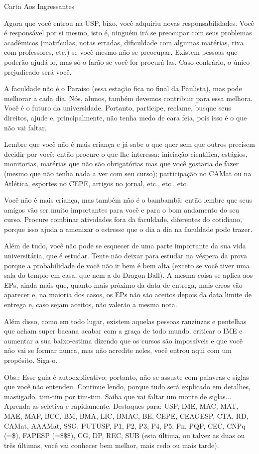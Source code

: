 \begin{secao}{Carta Aos Ingressantes}

Agora que você entrou na USP, bixo, você adquiriu novas responsabilidades.
Você é responsável por si mesmo, isto é, ninguém irá se preocupar com seus
problemas acadêmicos (matrículas, notas erradas, dificuldade com algumas
matérias, rixa com professores, etc.) se você mesmo não se preocupar. Existem
pessoas que poderão ajudá-lo, mas só o farão se você for procurá-las. Caso
contrário, o único prejudicado será você.

A faculdade não é o Paraíso (essa estação fica no final da Paulista), mas pode
melhorar a cada dia. Nós, alunos, também devemos contribuir para essa melhora.
Você é o futuro da universidade. Portanto, participe, reclame, busque seus
direitos, ajude e, principalmente, não tenha medo de cara feia, pois isso é o
que não vai faltar. 

Lembre que você não é mais criança e já sabe o que quer sem que outros precisem decidir por você; então procure o que lhe interessa: iniciação científica,
estágios, monitorias, matérias que não são obrigatórias mas que você gostaria
de fazer (mesmo que não tenha nada a ver com seu curso); participação no
CAMat ou na Atlética, esportes no CEPE, artigos no jornal, etc., etc., etc.

Você não é mais criança, mas também não é o bambambã; então lembre que
seus amigos vão ser muito importantes para você e para o bom andamento do seu
curso. Procure combinar atividades fora da faculdade, diferentes do cotidiano,
porque isso ajuda a amenizar o estresse que o dia a dia na faculdade pode trazer.

Além de tudo, você não pode se esquecer de uma parte importante da sua vida
universitária, que é estudar. Tente não deixar para estudar na véspera da prova
porque a probabilidade de você não ir bem é bem alta (exceto se você tiver
uma sala do templo em casa, que nem a do Dragon Ball). A mesma coisa se aplica aos EPs,
ainda mais que, quanto mais próximo da data de entrega, mais erros vão aparecer
e, na maioria dos casos, os EPs não são aceitos depois da data limite de entrega
e, caso sejam aceitos, não valerão a mesma nota.

Além disso, como em todo lugar, existem aquelas pessoas ranzinzas e pentelhas
que acham super bacana acabar com a graça de todo mundo, criticar o IME e aumentar
a sua baixo-estima dizendo que os cursos são impossíveis e que
você não vai se formar nunca, mas não acredite neles, você entrou aqui com um
propósito. Siga-o.

Obs.: Esse guia é autoexplicativo; portanto, não se assuste com palavras e siglas
que você não entendeu. Continue lendo, porque tudo será explicado em detalhes,
mastigado, tim-tim por tim-tim. Saiba que vai faltar um monte de siglas...
Aprenda-as seletiva e rapidamente. Destaques para: USP, IME, MAC, MAT, MAE, MAP,
BCC, BM, BMA, LIC, BMAC, BE, CEPE, CEAGESP, CTA, RD, CAMat, AAAMat, SSG, PUTUSP,
P1, P2, P3, P4, P5, Pn, PQP, CEC, CNPq (=\$), FAPESP (=\$\$\$), CG, DP, REC, SUB
(esta última, ou talvez as duas ou três últimas, você vai conhecer bem melhor, mais cedo ou mais tarde).

\end{secao}
